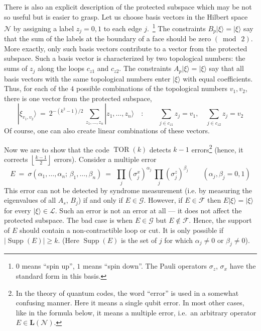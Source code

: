 \documentclass[12pt]{article}
\newcommand{\LL}{\mathbf{L}}
\newcommand{\Supp}{\mathop\mathrm{Supp}\nolimits}
\newcommand{\TOR}{\mathop\mathrm{TOR}\nolimits}
\newcommand{\calF}{\mathcal{F}}
\newcommand{\calG}{\mathcal{G}}
\newcommand{\calL}{\mathcal{L}}
\newcommand{\calN}{\mathcal{N}}
\begin{document}
There is also an explicit description of the protected subspace which may be 
not so useful but is easier to grasp. Let us choose basis vectors in the 
Hilbert space $\calN$ by assigning a label $z_j=0,1$ to each edge 
$j$.~\footnote{
 $0$ means ``spin up'', $1$ means ``spin down''. The Pauli operators 
 $\sigma_z$, $\sigma_x$ have the standard form in this basis.}
The constraints $B_p|\xi\rangle=|\xi\rangle$ say that the sum of the labels 
at the boundary of a face should be zero $(\bmod\ 2)$. More exactly, only such 
basis vectors contribute to a vector from the protected subspace. Such a 
basis vector is characterized by two topological numbers: the sums of $z_j$ 
along the loops $c_{z1}$ and $c_{z2}$. The constraints 
$A_p|\xi\rangle=|\xi\rangle$ say that all basis vectors with the same 
topological numbers enter $|\xi\rangle$ with equal coefficients. 
Thus, for each of the $4$ possible combinations of the topological numbers 
$v_1,v_2$, there is one vector from the protected subspace,
\begin{equation} \label{grstate}
  |\xi_{v_1,v_2}\rangle\ =\ 
  2^{-(k^2-1)/2}\, \sum_{z_1,\ldots,z_n}|z_1,\ldots,z_n\rangle\quad : \qquad
  \sum_{j\in c_{z1}}z_j=v_1,\quad \sum_{j\in c_{z2}}z_j=v_2
\end{equation}
Of course, one can also create linear combinations of these vectors.

Now we are to show that the code $\TOR(k)$ detects $k-1$ errors\footnote{
 In the theory of quantum codes, the word ``error'' is used in a somewhat 
 confusing manner. Here it means a single qubit error. In most other cases, 
 like in the formula below, it means a multiple error, i.e.\ an arbitrary 
 operator $E\in\LL(\calN)$.} 
(hence, it corrects $\left\lfloor\frac{k-1}{2}\right\rfloor$ errors). 
Consider a multiple error
\[
  E\ =\ \sigma(\alpha_1,\ldots,\alpha_n;\,\beta_1,\ldots,\beta_n)\ =\,\ 
  \prod_j(\sigma^x_j)^{\alpha_j}\ \prod_j(\sigma^z_j)^{\beta_j}
  \qquad (\alpha_j,\beta_j=0,1)
\]
This error can not be detected  by syndrome measurement (i.e. by measuring 
the eigenvalues of all $A_s$, $B_j$) if and only if $E\in\calG$. However, if 
$E\in\calF$ then $E|\xi\rangle=|\xi\rangle$ for every $|\xi\rangle\in\calL$. 
Such an error is not an error at all --- it does not affect the protected 
subspace. The bad case is when $E\in\calG$ but $E\not\in\calF$. Hence, the 
support of $E$ should contain a non-contractible loop or cut. It is only 
possible if $|\Supp(E)|\ge k$. (Here $\Supp(E)$ is the set of $j$ 
for which $\alpha_j\not=0$ or $\beta_j\not=0$).
\end{document}
